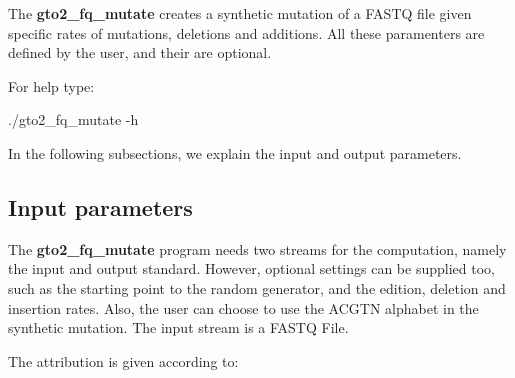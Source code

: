 \documentclass[11pt,]{krantz}
\newenvironment{Shaded}{\begin{snugshade}}{\end{snugshade}}
\newcommand{\ExtensionTok}[1]{#1}
\newcommand{\NormalTok}[1]{#1}
\begin{document}
The \textbf{gto2\_fq\_mutate} creates a synthetic mutation of a FASTQ
file given specific rates of mutations, deletions and additions. All
these paramenters are defined by the user, and their are optional.

For help type:

\begin{Shaded}
\begin{Highlighting}[]
\ExtensionTok{./gto2_fq_mutate}\NormalTok{ -h}
\end{Highlighting}
\end{Shaded}

In the following subsections, we explain the input and output
parameters.

\subsection*{Input parameters}\label{input-parameters-10}


The \textbf{gto2\_fq\_mutate} program needs two streams for the
computation, namely the input and output standard. However, optional
settings can be supplied too, such as the starting point to the random
generator, and the edition, deletion and insertion rates. Also, the user
can choose to use the ACGTN alphabet in the synthetic mutation. The
input stream is a FASTQ File.

The attribution is given according to:
\end{document}
